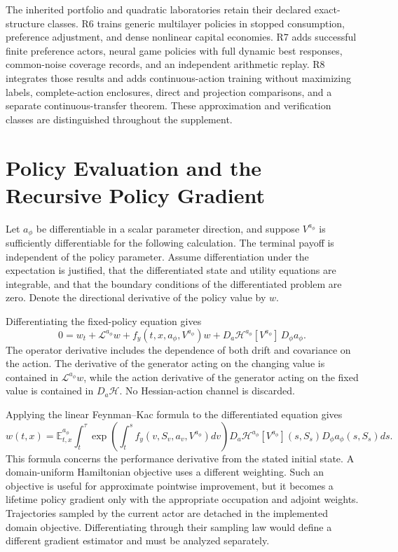 \documentclass[ecta,nameyear,draft]{econsocart}
\theoremstyle{definition}
\theoremstyle{remark}
\newcommand{\E}{\mathbb E}
\newcommand{\HH}{\mathcal H}
\newcommand{\LL}{\mathcal L}
\begin{document}
The inherited portfolio and quadratic laboratories retain their declared exact-structure classes. R6 trains generic multilayer policies in stopped consumption, preference adjustment, and dense nonlinear capital economies. R7 adds successful finite preference actors, neural game policies with full dynamic best responses, common-noise coverage records, and an independent arithmetic replay. R8 integrates those results and adds continuous-action training without maximizing labels, complete-action enclosures, direct and projection comparisons, and a separate continuous-transfer theorem. These approximation and verification classes are distinguished throughout the supplement.

\section{Policy Evaluation and the Recursive Policy Gradient}
Let $a_\phi$ be differentiable in a scalar parameter direction, and suppose $V^{a_\phi}$ is sufficiently differentiable for the following calculation. The terminal payoff is independent of the policy parameter. Assume differentiation under the expectation is justified, that the differentiated state and utility equations are integrable, and that the boundary conditions of the differentiated problem are zero. Denote the directional derivative of the policy value by $w$.

Differentiating the fixed-policy equation gives
\[
 0=w_t+\LL^{a_\phi}w+f_y(t,x,a_\phi,V^{a_\phi})w
  +D_a\HH^{a_\phi}[V^{a_\phi}]\,D_\phi a_\phi.
\]
The operator derivative includes the dependence of both drift and covariance on the action. The derivative of the generator acting on the changing value is contained in $\LL^{a_\phi}w$, while the action derivative of the generator acting on the fixed value is contained in $D_a\HH$. No Hessian-action channel is discarded.

Applying the linear Feynman--Kac formula to the differentiated equation gives
\[
 w(t,x)=\E_{t,x}^{a_\phi}\int_t^\tau
 \exp\left(\int_t^s f_y(v,S_v,a_v,V^{a_\phi})dv\right)
 D_a\HH^{a_\phi}[V^{a_\phi}](s,S_s)D_\phi a_\phi(s,S_s)ds.
\]
This formula concerns the performance derivative from the stated initial state. A domain-uniform Hamiltonian objective uses a different weighting. Such an objective is useful for approximate pointwise improvement, but it becomes a lifetime policy gradient only with the appropriate occupation and adjoint weights. Trajectories sampled by the current actor are detached in the implemented domain objective. Differentiating through their sampling law would define a different gradient estimator and must be analyzed separately.
\end{document}
